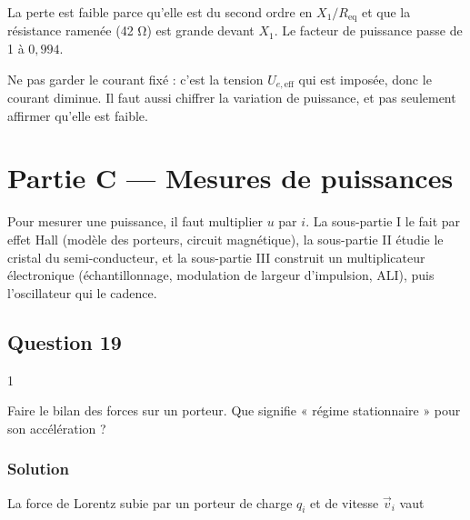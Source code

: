 \documentclass[11pt,a4paper]{article}
\newcommand{\equationajustee}[1]{%
  \sbox{\boiteequation}{$\displaystyle #1$}%
  \ifdim\wd\boiteequation>\linewidth
    \[\resizebox{\linewidth}{!}{\usebox{\boiteequation}}\]%
  \else
    \[#1\]%
  \fi}
\begin{document}
\equationajustee{\boxed{\frac{\Delta P}{P}\approx-1{,}2\ \%}}

La perte est faible parce qu'elle est du second ordre en \(X_1/R_{\text{eq}}\) et que la résistance ramenée (42 Ω) est grande devant \(X_1\). Le facteur de puissance passe de 1 à \(0{,}994\).

\begin{piege}

Ne pas garder le courant fixé : c'est la tension \(U_{e,\text{eff}}\) qui est imposée, donc le courant diminue. Il faut aussi chiffrer la variation de puissance, et pas seulement affirmer qu'elle est faible.

\end{piege}

\hypertarget{partie-c-mesures-de-puissances}{%
\section{Partie C --- Mesures de puissances}\label{partie-c-mesures-de-puissances}}

Pour mesurer une puissance, il faut multiplier \(u\) par \(i\). La sous-partie I le fait par effet Hall (modèle des porteurs, circuit magnétique), la sous-partie II étudie le cristal du semi-conducteur, et la sous-partie III construit un multiplicateur électronique (échantillonnage, modulation de largeur d'impulsion, ALI), puis l'oscillateur qui le cadence.

\hypertarget{question-19}{%
\subsection{Question 19}\label{question-19}}

\begin{indication}{1}

Faire le bilan des forces sur un porteur. Que signifie « régime stationnaire » pour son accélération ?

\end{indication}

\hypertarget{solution-18}{%
\subsubsection{Solution}\label{solution-18}}

La force de Lorentz subie par un porteur de charge \(q_i\) et de vitesse \(\vec v_i\) vaut

\equationajustee{\boxed{\vec f_{L,i}=q_i\left(\vec E+\vec v_i\wedge\vec B_0\right)}}
\end{document}
